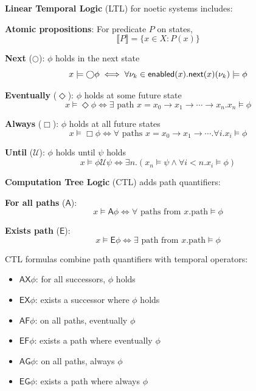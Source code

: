 \begin{definition}
\label{def:ltl-operators}
\textbf{Linear Temporal Logic} (LTL) for noetic systems includes:

\textbf{Atomic propositions}: For predicate $P$ on states,
\[
  \llbracket P \rrbracket = \{x \in X : P(x)\}
\]

\textbf{Next} ($\bigcirc$): $\phi$ holds in the next state
\[
  x \models \bigcirc \phi \iff \forall \nu_{k} \in \mathsf{enabled}(x). \mathsf{next}(x)(\nu_{k}) \models \phi
\]

\textbf{Eventually} ($\Diamond$): $\phi$ holds at some future state
\[
  x \models \Diamond \phi \iff \exists \text{ path } x = x_0 \to x_1 \to \cdots \to x_n. x_n \models \phi
\]

\textbf{Always} ($\Box$): $\phi$ holds at all future states
\[
  x \models \Box \phi \iff \forall \text{ paths } x = x_0 \to x_1 \to \cdots. \forall i. x_i \models \phi
\]

\textbf{Until} ($\mathcal{U}$): $\phi$ holds until $\psi$ holds
\[
  x \models \phi \mathcal{U} \psi \iff \exists n. (x_n \models \psi \land \forall i < n. x_i \models \phi)
\]
\end{definition}

\begin{definition}
\label{def:ctl-operators}
\textbf{Computation Tree Logic} (CTL) adds path quantifiers:

\textbf{For all paths} ($\mathsf{A}$):
\[
  x \models \mathsf{A}\phi \iff \forall \text{ paths from } x. \text{path} \models \phi
\]

\textbf{Exists path} ($\mathsf{E}$):
\[
  x \models \mathsf{E}\phi \iff \exists \text{ path from } x. \text{path} \models \phi
\]

CTL formulas combine path quantifiers with temporal operators:
\begin{itemize}
  \item $\mathsf{AX}\phi$: for all successors, $\phi$ holds
  \item $\mathsf{EX}\phi$: exists a successor where $\phi$ holds
  \item $\mathsf{AF}\phi$: on all paths, eventually $\phi$
  \item $\mathsf{EF}\phi$: exists a path where eventually $\phi$
  \item $\mathsf{AG}\phi$: on all paths, always $\phi$
  \item $\mathsf{EG}\phi$: exists a path where always $\phi$
\end{itemize}
\end{definition}

